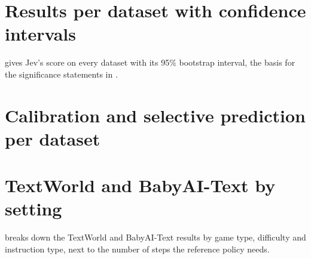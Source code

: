 \documentclass[table]{article}
\begin{document}



\appendix

\section{Results per dataset with confidence intervals}
\label{app:results}

 gives Jev's score on every dataset with its 95\% bootstrap interval, the basis for the significance statements in .

\begin{table}[p]
\centering
\caption{Main results on the evaluation splits. Score: primary metric (see text); 95\% bootstrap confidence interval; ECE of the first Choice or Noul question (-- for Score-only tasks).}
\label{tab:results}
\footnotesize
\setlength{\tabcolsep}{4pt}

\end{table}

\newpage
\section{Calibration and selective prediction per dataset}

\begin{table}[h]
\centering
\caption{Choice datasets: accuracy, ECE of the top-option probability, accuracy on the 80\% and 50\% most confident examples (ranked by Jev's confidence), and area under the risk--coverage curve.}
\label{tab:calibration}
\footnotesize
\setlength{\tabcolsep}{4pt}

\end{table}



\section{TextWorld and BabyAI-Text by setting}
\label{app:textworld-babyai}

 breaks down the TextWorld and BabyAI-Text results by game type, difficulty and instruction type, next to the number of steps the reference policy needs.
\end{document}
